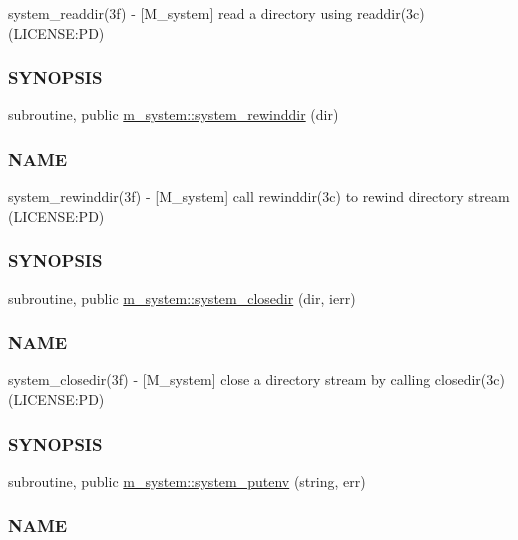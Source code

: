\begin{DoxyCompactItemize}
\begin{DoxyCompactList}
system\+\_\+readdir(3f) -\/ \mbox{[}M\+\_\+system\mbox{]} read a directory using readdir(3c) (L\+I\+C\+E\+N\+SE\+:PD) \subsubsection*{S\+Y\+N\+O\+P\+S\+IS}\end{DoxyCompactList}\item 
subroutine, public \mbox{\hyperlink{namespacem__system_a3ffe757195ade8052e8acabd196ee3ca}{m\+\_\+system\+::system\+\_\+rewinddir}} (dir)
\begin{DoxyCompactList}\small\item\em \subsubsection*{N\+A\+ME}

system\+\_\+rewinddir(3f) -\/ \mbox{[}M\+\_\+system\mbox{]} call rewinddir(3c) to rewind directory stream (L\+I\+C\+E\+N\+SE\+:PD) \subsubsection*{S\+Y\+N\+O\+P\+S\+IS}\end{DoxyCompactList}\item 
subroutine, public \mbox{\hyperlink{namespacem__system_acd442b52c64fc50482bc08b0ac8a50d1}{m\+\_\+system\+::system\+\_\+closedir}} (dir, ierr)
\begin{DoxyCompactList}\small\item\em \subsubsection*{N\+A\+ME}

system\+\_\+closedir(3f) -\/ \mbox{[}M\+\_\+system\mbox{]} close a directory stream by calling closedir(3c) (L\+I\+C\+E\+N\+SE\+:PD) \subsubsection*{S\+Y\+N\+O\+P\+S\+IS}\end{DoxyCompactList}\item 
subroutine, public \mbox{\hyperlink{namespacem__system_af0c9df8e59cac9cd617cd1e20448ea7d}{m\+\_\+system\+::system\+\_\+putenv}} (string, err)
\begin{DoxyCompactList}\small\item\em \subsubsection*{N\+A\+ME}


\end{DoxyCompactList}
\end{DoxyCompactItemize}
